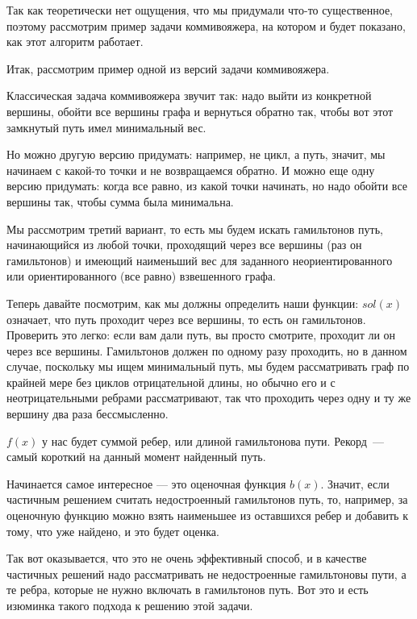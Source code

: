 \documentclass[russian]{lecture-notes}
\theoremstyle{definition}
\begin{document}
		Так как теоретически нет ощущения, что мы придумали что-то существенное, поэтому рассмотрим пример задачи коммивояжера, на котором и будет показано, как этот алгоритм работает. 
		
		\begin{example*} 
			
			Итак, рассмотрим пример одной из версий задачи коммивояжера. 
			
			Классическая задача коммивояжера звучит так: надо выйти из конкретной вершины, обойти все вершины графа и вернуться обратно так, чтобы вот этот замкнутый путь имел минимальный вес.

			Но можно другую версию придумать: например, не цикл, а путь, значит, мы начинаем с какой-то точки и не возвращаемся обратно.
			И можно еще одну версию придумать: когда все равно, из какой точки начинать, но надо обойти все вершины так, чтобы сумма была минимальна.
			
			Мы рассмотрим третий вариант, то есть мы будем искать гамильтонов путь,
			начинающийся из любой точки, проходящий через все вершины (раз он гамильтонов) и имеющий наименьший вес для заданного неориентированного или ориентированного (все равно) взвешенного графа.
			
			Теперь давайте посмотрим, как мы должны определить наши функции: $sol(x)$ означает, что путь проходит через все вершины, то есть он гамильтонов. Проверить это легко: если вам дали путь, вы просто смотрите, проходит ли он через все вершины.	
			Гамильтонов должен по одному разу проходить, но в данном случае, поскольку мы ищем минимальный путь, мы будем рассматривать граф по крайней мере без циклов отрицательной длины, но обычно его и с неотрицательными ребрами рассматривают, так что проходить через одну и ту же вершину два раза бессмысленно. 
			
			$f(x)$ у нас будет суммой ребер, или длиной гамильтонова пути. Рекорд~--- самый короткий на данный момент найденный путь.
			
			Начинается самое интересное --- это оценочная функция $b(x)$. 
			Значит, если частичным решением считать недостроенный гамильтонов путь, то, например, за оценочную функцию можно взять наименьшее из оставшихся ребер и добавить к тому, что уже найдено, и это будет оценка.
			
			Так вот оказывается, что это не очень эффективный способ, и в качестве частичных решений надо рассматривать не недостроенные гамильтоновы пути,
			а те ребра, которые не нужно включать в гамильтонов путь. Вот это и есть изюминка такого подхода к решению этой задачи. 
			

\end{example*}
\end{document}
